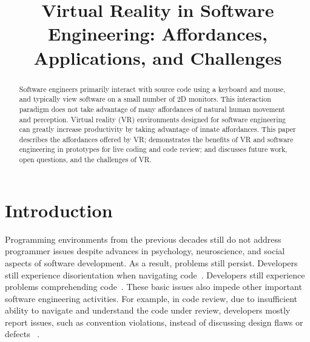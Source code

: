 \documentclass[conference]{IEEEtran}
\begin{document}
\title{Virtual Reality in Software Engineering: Affordances, Applications, and Challenges}

\author{
\and
{}
\and
{}
}

\maketitle
\begin{abstract}
Software engineers primarily interact with source code using a keyboard and mouse, and typically view software on a small number of 2D monitors.
This interaction paradigm does not take advantage of many affordances of natural human movement and perception.
Virtual reality (VR) environments designed for software engineering can greatly increase productivity by taking advantage of innate affordances.
This paper describes the affordances offered by VR; demonstrates the benefits of VR and software engineering in prototypes for live coding and code review; and discusses future work, open questions, and the challenges of VR.
\end{abstract}

\section{Introduction}

Programming environments from the previous decades still do not address programmer issues despite advances in psychology, neuroscience, and social aspects of software development.
As a result, problems still persist.  Developers still experience disorientation when navigating code~\cite{Henley:2014}.
Developers still experience problems comprehending code~\cite{Maalej:TOSEM:2014}.  These basic issues also impede other important software engineering activities. For example,
in code review, due to insufficient ability to navigate and understand the code under review, developers mostly report issues, such as convention violations, instead of discussing design flaws or defects
~\cite{bacchelli:ModernCodeReviewChallenges}.  
\end{document}
